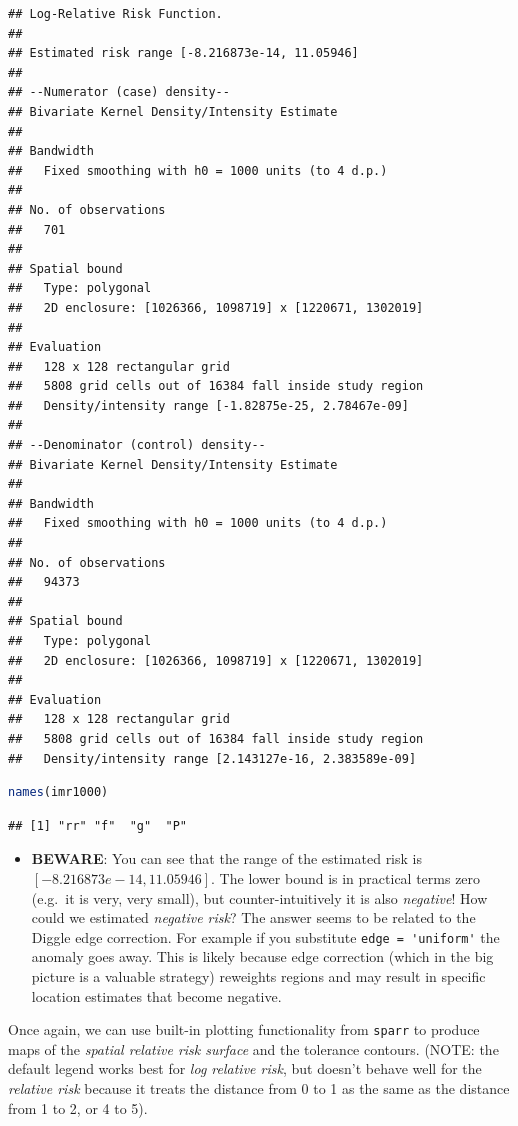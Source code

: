 \documentclass[
]{book}
\newcommand{\passthrough}[1]{#1}
\newenvironment{rmdblock}[1]
  {%
  \begin{itemize}
  \renewcommand{\labelitemi}{
    \raisebox{-.7\height}[0pt][0pt]{
      {\setkeys{Gin}{width=3em,keepaspectratio}\texttt{[image: images/\#1]}}
    }
  }
  \item
  }
  {
  \end{itemize}
  }
\newenvironment{rmdcaution}
  {\begin{rmdblock}{caution}}
  {\end{rmdblock}}
\begin{document}
\begin{lstlisting}
## Log-Relative Risk Function.
## 
## Estimated risk range [-8.216873e-14, 11.05946]
## 
## --Numerator (case) density--
## Bivariate Kernel Density/Intensity Estimate
## 
## Bandwidth
##   Fixed smoothing with h0 = 1000 units (to 4 d.p.)
## 
## No. of observations
##   701 
## 
## Spatial bound
##   Type: polygonal
##   2D enclosure: [1026366, 1098719] x [1220671, 1302019]
## 
## Evaluation
##   128 x 128 rectangular grid
##   5808 grid cells out of 16384 fall inside study region
##   Density/intensity range [-1.82875e-25, 2.78467e-09]
## 
## --Denominator (control) density--
## Bivariate Kernel Density/Intensity Estimate
## 
## Bandwidth
##   Fixed smoothing with h0 = 1000 units (to 4 d.p.)
## 
## No. of observations
##   94373 
## 
## Spatial bound
##   Type: polygonal
##   2D enclosure: [1026366, 1098719] x [1220671, 1302019]
## 
## Evaluation
##   128 x 128 rectangular grid
##   5808 grid cells out of 16384 fall inside study region
##   Density/intensity range [2.143127e-16, 2.383589e-09]
\end{lstlisting}

\begin{lstlisting}[language=R]
names(imr1000)
\end{lstlisting}

\begin{lstlisting}
## [1] "rr" "f"  "g"  "P"
\end{lstlisting}

\begin{rmdcaution}
\textbf{BEWARE}: You can see that the range of the estimated risk is \([-8.216873e-14, 11.05946]\). The lower bound is in practical terms zero (e.g.~it is very, very small), but counter-intuitively it is also \emph{negative}! How could we estimated \emph{negative risk}? The answer seems to be related to the Diggle edge correction. For example if you substitute \passthrough{\lstinline!edge = 'uniform'!} the anomaly goes away. This is likely because edge correction (which in the big picture is a valuable strategy) reweights regions and may result in specific location estimates that become negative.
\end{rmdcaution}

Once again, we can use built-in plotting functionality from \passthrough{\lstinline!sparr!} to produce maps of the \emph{spatial relative risk surface} and the tolerance contours. (NOTE: the default legend works best for \emph{log relative risk}, but doesn't behave well for the \emph{relative risk} because it treats the distance from 0 to 1 as the same as the distance from 1 to 2, or 4 to 5).
\end{document}
